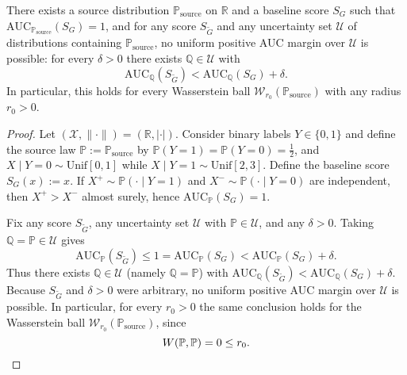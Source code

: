 ﻿\begin{theorem}\label{thm:auc-no-margin-wasserstein}
There exists a source distribution \(\mathbb P_{\mathrm{source}}\) on \(\mathbb R\) and a baseline score \(S_G\) such that \(\mathrm{AUC}_{\mathbb P_{\mathrm{source}}}(S_G)=1\), and for any score \(S_{\tilde G}\) and any uncertainty set \(\mathcal U\) of distributions containing \(\mathbb P_{\mathrm{source}}\), no uniform positive AUC margin over \(\mathcal U\) is possible: for every \(\delta>0\) there exists \(\mathbb Q\in\mathcal U\) with
\[
\mathrm{AUC}_{\mathbb Q}(S_{\tilde G})<\mathrm{AUC}_{\mathbb Q}(S_G)+\delta.
\]
In particular, this holds for every Wasserstein ball \(\mathcal W_{r_0}(\mathbb P_{\mathrm{source}})\) with any radius \(r_0>0\).
\end{theorem}

\begin{proof}
Let \((\mathcal X,\lVert\cdot\rVert)=(\mathbb R,|\cdot|)\). Consider binary labels \(Y\in\{0,1\}\) and define the source law \(\mathbb P:=\mathbb P_{\mathrm{source}}\) by
\(\mathbb P(Y=1)=\mathbb P(Y=0)=\tfrac12\), and
\(X\mid Y=0\sim \mathrm{Unif}[0,1]\) while \(X\mid Y=1\sim \mathrm{Unif}[2,3]\).
Define the baseline score \(S_G(x):=x\). If \(X^+\sim \mathbb P(\cdot\mid Y{=}1)\) and \(X^-\sim \mathbb P(\cdot\mid Y{=}0)\) are independent, then \(X^+>X^-\) almost surely, hence \(\mathrm{AUC}_{\mathbb P}(S_G)=1\).

Fix any score \(S_{\tilde G}\), any uncertainty set \(\mathcal U\) with \(\mathbb P\in\mathcal U\), and any \(\delta>0\). Taking \(\mathbb Q=\mathbb P\in\mathcal U\) gives
\[
\mathrm{AUC}_{\mathbb P}(S_{\tilde G})\le 1=\mathrm{AUC}_{\mathbb P}(S_G)<\mathrm{AUC}_{\mathbb P}(S_G)+\delta.
\]
Thus there exists \(\mathbb Q\in\mathcal U\) (namely \(\mathbb Q=\mathbb P\)) with \(\mathrm{AUC}_{\mathbb Q}(S_{\tilde G})<\mathrm{AUC}_{\mathbb Q}(S_G)+\delta\). Because \(S_{\tilde G}\) and \(\delta>0\) were arbitrary, no uniform positive AUC margin over \(\mathcal U\) is possible. In particular, for every \(r_0>0\) the same conclusion holds for the Wasserstein ball \(\mathcal W_{r_0}(\mathbb P_{\mathrm{source}})\), since
\[
W(\mathbb P,\mathbb P)=0\le r_0.\qedhere
\]
\end{proof}
